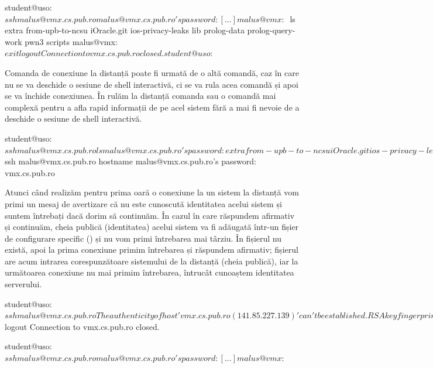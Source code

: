\begin{screen}[caption={Acces shell la distanță folosind SSH},label={lst:sec:ssh-shell}]
student@uso:~$ ssh malus@vmx.cs.pub.ro
malus@vmx.cs.pub.ro's password:
[...]
malus@vmx:~$ ls
extra  from-upb-to-ncsu  iOracle.git  ios-privacy-leaks  lib  prolog-data  prolog-query-work  pwn3  scripts
malus@vmx:~$ exit
logout
Connection to vmx.cs.pub.ro closed.
student@uso:~$
\end{screen}

Comanda de conexiune la distanță poate fi urmată de o altă comandă, caz în care nu se va deschide o sesiune de shell interactivă, ci se va rula acea comandă și apoi se va închide conexiunea. În  rulăm la distanță comanda  sau o comandă mai complexă pentru a afla rapid informații de pe acel sistem fără a mai fi nevoie de a deschide o sesiune de shell interactivă.

\begin{screen}[caption={Rulare comenzi la distanță prin SSH},label={lst:sec:ssh-commands}]
student@uso:~$ ssh malus@vmx.cs.pub.ro ls
malus@vmx.cs.pub.ro's password:
extra
from-upb-to-ncsu
iOracle.git
ios-privacy-leaks
lib
prolog-data
prolog-query-work
pwn3
scripts
student@uso:~$ ssh malus@vmx.cs.pub.ro hostname
malus@vmx.cs.pub.ro's password:
vmx.cs.pub.ro
\end{screen}

Atunci când realizăm pentru prima oară o conexiune la un sistem la distanță vom primi un mesaj de avertizare că nu este cunoscută identitatea acelui sistem și suntem întrebați dacă dorim să continuăm. În cazul în care răspundem afirmativ și continuăm, cheia publică (identitatea) acelui sistem va fi adăugată într-un fișier de configurare specific () și nu vom primi întrebarea mai târziu. În  fișierul  nu există, apoi la prima conexiune primim întrebarea și răspundem afirmativ; fișierul  are acum intrarea corespunzătoare sistemului de la distanță (cheia publică), iar la următoarea conexiune nu mai primim întrebarea, întrucât cunoaștem identitatea serverului.

\begin{screen}[caption={Verificarea identității serverului prin SSH},label={lst:sec:ssh-host-check}]
student@uso:~$ ssh malus@vmx.cs.pub.ro
The authenticity of host 'vmx.cs.pub.ro (141.85.227.139)' can't be established.
RSA key fingerprint is SHA256:CrRMD7nrflw7/KEZ4z7lksvEd8tXxkjuVXoBqsG5Vdc.
Are you sure you want to continue connecting (yes/no)? yes
Warning: Permanently added 'vmx.cs.pub.ro,141.85.227.139' (RSA) to the list of known hosts.
malus@vmx.cs.pub.ro's password:
[...]
malus@vmx:~$ logout
Connection to vmx.cs.pub.ro closed.

student@uso:~$ ssh malus@vmx.cs.pub.ro
malus@vmx.cs.pub.ro's password:
[...]
malus@vmx:~$
\end{screen}

